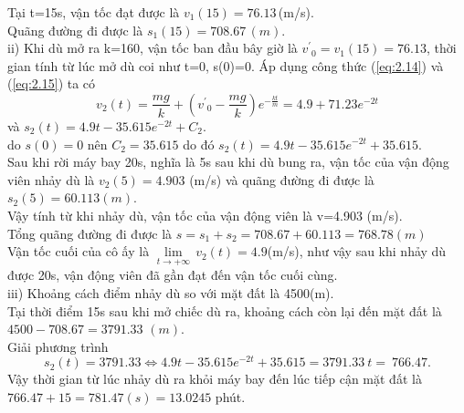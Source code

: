 Tại t=15s, vận tốc đạt được là ${{v}_{1}}(15)=76.13\,$(m/s). \\
Quãng đường đi được là ${{s}_{1}}(15)=708.67\,(m)$.\\
ii) Khi dù mở ra k=160,  vận tốc ban đầu bây giờ là ${{v}^{'}}_{0}={{v}_{1}}(15)=76.13$, thời gian tính từ lúc mở dù coi như t=0, s(0)=0. Áp dụng công thức (\ref{eq:2.14}) và (\ref{eq:2.15}) ta có 
$${{v}_{2}}(t)=\dfrac{mg}{k}+({{v}^{'}}_{0}-\dfrac{mg}{k}){{e}^{-\frac{kt}{m}}}=4.9+71.23{{e}^{-2t}}$$ và ${{s}_{2}}(t)=4.9t-35.615{{e}^{-2t}}+{{C}_{2}}.$\\
do $s(0)=0$ nên ${{C}_{2}}=35.615$ do đó ${{s}_{2}}(t)=4.9t-35.615{{e}^{-2t}}+35.615$.\\
Sau khi rời máy bay 20s, nghĩa là 5s sau khi dù bung ra, vận tốc của vận động viên nhảy dù là ${{v}_{2}}\left( 5 \right)=4.903$ (m/s) và quãng đường đi được là ${{s}_{2}}\left( 5 \right)=60.113\left( m \right).$\\
Vậy tính từ khi nhảy dù, vận tốc của vận động viên là v=4.903 (m/s).\\
Tổng quãng đường đi được là $s={{s}_{1}}+{{s}_{2}}=708.67+60.113=768.78\left( m \right)$\\
Vận tốc cuối của cô ấy là $\underset{t\to +\infty }{\mathop{\lim }}\,{{v}_{2}}(t)=4.9$(m/s), như vậy sau khi nhảy dù được 20s, vận động viên đã gần đạt đến vận tốc cuối cùng.\\
iii) Khoảng cách điểm nhảy dù so với mặt đất là 4500(m).\\
Tại thời điểm 15s sau khi mở chiếc dù ra, khoảng cách còn lại đến mặt đất là \newline
$4500-708.67=3791.33\,\,(m).$\\
Giải phương trình $$s_{2}(t)=3791.33\Leftrightarrow 4.9t-35.615{{e}^{-2t}}+35.615=3791.33~ t=~766.47.$$
Vậy thời gian từ lúc nhảy dù ra khỏi máy bay đến lúc tiếp cận mặt đất là \newline
$766.47+15=781.47(s)=13.0245$ phút.
